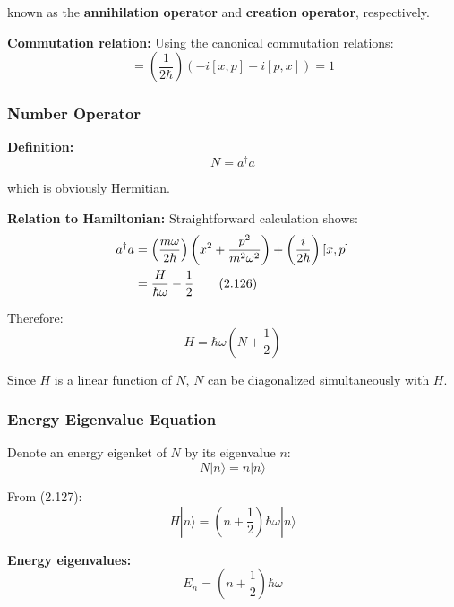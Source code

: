 \documentclass[11pt,a4paper]{article}
\begin{document}
known as the \textbf{annihilation operator} and \textbf{creation operator}, respectively.

\textbf{Commutation relation:}
Using the canonical commutation relations:
\begin{equation}
[a, a^\dagger] = \left(\frac{1}{2\hbar}\right)(-i[x,p] + i[p,x]) = 1
\tag{2.124}
\end{equation}

\subsubsection{Number Operator}

\textbf{Definition:}
\begin{equation}
N = a^\dagger a
\tag{2.125}
\end{equation}

which is obviously Hermitian.

\textbf{Relation to Hamiltonian:}
Straightforward calculation shows:
\begin{align}
a^\dagger a &= \left(\frac{m\omega}{2\hbar}\right)\left(x^2 + \frac{p^2}{m^2\omega^2}\right) + \left(\frac{i}{2\hbar}\right)[x,p] \notag \\
&= \frac{H}{\hbar\omega} - \frac{1}{2}
\tag{2.126}
\end{align}

Therefore:
\begin{equation}
\boxed{H = \hbar\omega\left(N + \frac{1}{2}\right)}
\tag{2.127}
\end{equation}

Since $H$ is a linear function of $N$, $N$ can be diagonalized simultaneously with $H$.

\subsubsection{Energy Eigenvalue Equation}

Denote an energy eigenket of $N$ by its eigenvalue $n$:
\begin{equation}
N|n\rangle = n|n\rangle
\tag{2.128}
\end{equation}

From (2.127):
\begin{equation}
H|n\rangle = \left(n + \frac{1}{2}\right)\hbar\omega|n\rangle
\tag{2.129}
\end{equation}

\textbf{Energy eigenvalues:}
\begin{equation}
\boxed{E_n = \left(n + \frac{1}{2}\right)\hbar\omega}
\tag{2.130}
\end{equation}
\end{document}
